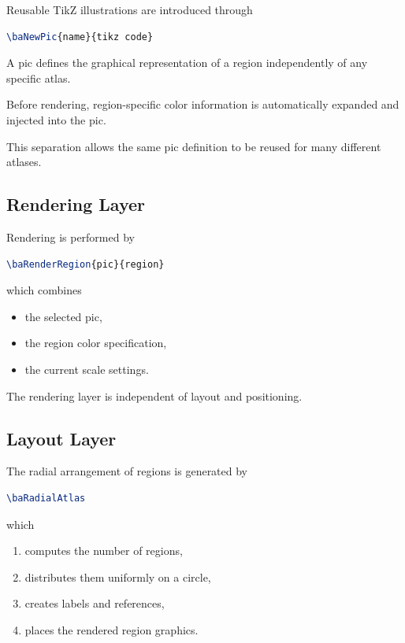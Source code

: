 Reusable TikZ illustrations are introduced through

\begin{lstlisting}[language=LaTeX]
\baNewPic{name}{tikz code}
\end{lstlisting}

A pic defines the graphical representation of a region independently of any specific atlas.

Before rendering, region-specific color information is automatically expanded and injected into the pic.

This separation allows the same pic definition to be reused for many different atlases.

\subsection{Rendering Layer}

Rendering is performed by

\begin{lstlisting}[language=LaTeX]
\baRenderRegion{pic}{region}
\end{lstlisting}

which combines

\begin{itemize}
\item the selected pic,
\item the region color specification,
\item the current scale settings.
\end{itemize}

The rendering layer is independent of layout and positioning.

\subsection{Layout Layer}

The radial arrangement of regions is generated by

\begin{lstlisting}[language=LaTeX]
\baRadialAtlas
\end{lstlisting}

which

\begin{enumerate}
\item computes the number of regions,
\item distributes them uniformly on a circle,
\item creates labels and references,
\item places the rendered region graphics.
\end{enumerate}

